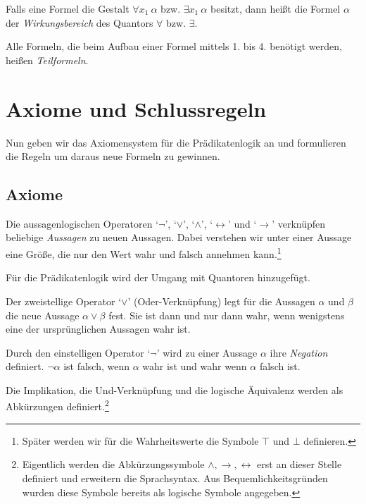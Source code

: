 \documentclass[a4paper,german,10pt,twoside]{book}
\theoremstyle{definition}
\theoremstyle{remark}
\begin{document}
\par
Falls eine Formel die Gestalt $\forall x_1 ~ \alpha$ bzw. $\exists x_1 ~ \alpha$ besitzt, dann hei{\ss}t die Formel $\alpha$ der
\emph{Wirkungsbereich} des Quantors $\forall$ bzw. $\exists$.

\par
Alle Formeln, die beim Aufbau einer Formel mittels 1. bis 4. ben{\"o}tigt werden, hei{\ss}en \emph{Teilformeln}.



\chapter{Axiome und Schlussregeln} \label{chapter4} \hypertarget{chapter4}{}

Nun geben wir das Axiomensystem f{\"u}r die Pr{\"a}dikatenlogik an und formulieren die Regeln um daraus neue Formeln zu gewinnen.

\section{Axiome} \label{chapter4_section0} \hypertarget{chapter4_section0}{}
Die aussagenlogischen Operatoren \mbox{`$\neg$'}, \mbox{`$\vee$'}, \mbox{`$\wedge$'}, \mbox{`$\leftrightarrow$'} und \mbox{`$\rightarrow$'} verkn{\"u}pfen beliebige \emph{Aussagen} zu neuen Aussagen. Dabei verstehen wir unter einer Aussage eine Gr{\"o}{\ss}e, die nur den Wert {\glqq wahr\grqq} und {\glqq falsch\grqq} annehmen kann.\footnote{Sp{\"a}ter werden wir f{\"u}r die Wahrheitswerte die Symbole $\top$ und $\bot$ definieren.}

F{\"u}r die Pr{\"a}dikatenlogik wird der Umgang mit Quantoren hinzugef{\"u}gt.

Der zweistellige Operator \mbox{`$\vee$'} (Oder-Verkn{\"u}pfung) legt f{\"u}r die Aussagen $\alpha$ und $\beta$ die neue Aussage 
$\alpha \vee \beta$ fest. Sie ist dann und nur dann wahr, wenn wenigstens eine der urspr{\"u}nglichen Aussagen wahr ist.

\par
Durch den einstelligen Operator \mbox{`$\neg$'} wird zu einer Aussage $\alpha$ ihre \emph{Negation} definiert. $\neg \alpha$ ist falsch, wenn $\alpha$ wahr ist und wahr wenn $\alpha$ falsch ist.
            
\par
Die Implikation, die Und-Verkn{\"u}pfung und die logische {\"A}quivalenz werden als Abk{\"u}rzungen definiert.\footnote{Eigentlich werden die Abk{\"u}rzungssymbole $\wedge, \rightarrow, \leftrightarrow$ erst an dieser Stelle definiert und erweitern die Sprachsyntax. Aus Bequemlichkeitsgr{\"u}nden wurden diese Symbole bereits als logische Symbole angegeben.}
\end{document}
